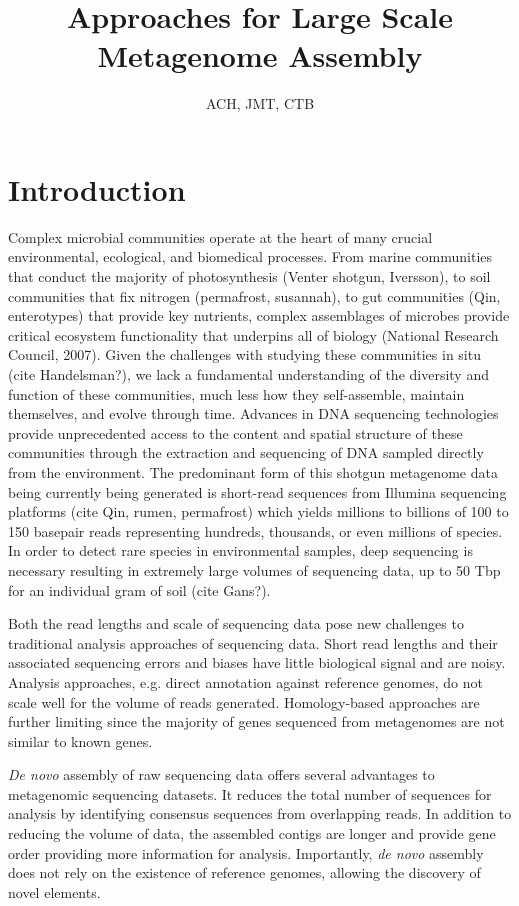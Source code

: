 \documentclass[11pt]{article} %
\begin{document}
\title{Approaches for Large Scale Metagenome Assembly}
\author{ACH, JMT, CTB}
\maketitle

\section{Introduction}  
Complex microbial communities operate at the heart of many crucial environmental, ecological, and biomedical processes.  From marine communities that conduct the majority of photosynthesis (Venter shotgun, Iversson), to soil communities that fix nitrogen (permafrost, susannah), to gut communities (Qin, enterotypes) that provide key nutrients, complex assemblages of microbes provide critical ecosystem functionality that underpins all of biology (National Research Council, 2007).  Given the challenges with studying these communities in situ (cite Handelsman?), we lack a fundamental understanding of the diversity and function of these communities, much less how they self-assemble, maintain themselves, and evolve through time.  
Advances in DNA sequencing technologies provide unprecedented access to the content and spatial structure of these communities through the extraction and sequencing of DNA sampled directly from the environment.  The predominant form of this shotgun metagenome data being currently being generated is short-read sequences from Illumina sequencing platforms (cite Qin, rumen, permafrost) which yields millions to billions of 100 to 150 basepair reads representing hundreds, thousands, or even millions of species.   In order to detect rare species in environmental samples, deep sequencing is necessary resulting in extremely large volumes of sequencing data, up to 50 Tbp for an individual gram of soil (cite Gans?).  

Both the read lengths and scale of sequencing data pose new challenges to traditional analysis approaches of sequencing data.  Short read lengths and their associated sequencing errors and biases have little biological signal and are noisy.  Analysis approaches, e.g. direct annotation against reference genomes, do not scale well for the volume of reads generated.  Homology-based approaches are further limiting since the majority of genes sequenced from metagenomes are not similar to known genes.  

\emph{De novo} assembly of raw sequencing data offers several advantages to metagenomic sequencing datasets.  It reduces the total number of sequences for analysis by identifying consensus sequences from overlapping reads.  In addition to reducing the volume of data, the assembled contigs are longer and provide gene order providing more information for analysis.  Importantly, \emph{de novo} assembly does not rely on the existence of reference genomes, allowing the discovery of novel elements.  
\end{document}
